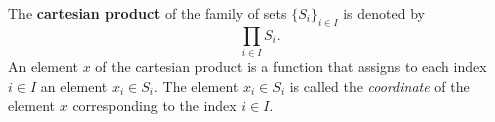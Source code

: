 The \textbf{cartesian product} of the family of sets $\{S_i\}_{i \in I}$ is denoted by
\[
\prod_{i \in I} S_i.
\]
An element $x$ of the cartesian product is a function that assigns to each index $i \in I$ an element $x_i \in S_i$. The element $x_i \in S_i$ is called the \emph{coordinate} of the element $x$ corresponding to the index $i \in I$.

